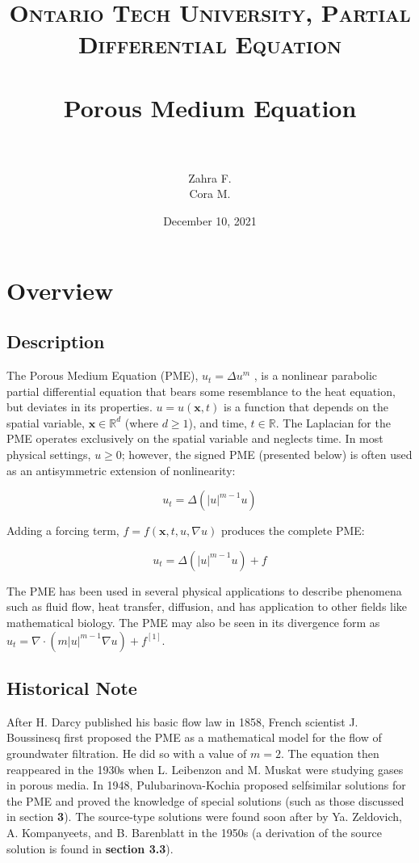 \documentclass[paper=a4, fontsize=12pt]{scrartcl} %
\title{	
\normalfont \normalsize 
\textsc{Ontario Tech University, Partial Differential Equation} \\ [25pt] %
\horrule{0.5pt} \\[0.4cm] %
\huge Porous Medium Equation\\ %
\horrule{2pt} \\[0.5cm] %
}
\author{Zahra F.\\ Cora M.}
\date{\normalsize December 10, 2021} %
\numberwithin{equation}{section} %
\numberwithin{table}{section} %
\begin{document}
\maketitle

\tableofcontents

\doublespacing
\section{Overview}
\subsection{Description}

The Porous Medium Equation (PME), $u_t = \Delta u^m$ , is a nonlinear parabolic partial differential equation that bears some resemblance to the heat equation, but deviates in its properties. $u=u(\mathbf{x}, t)$ is a function that depends on the spatial variable, $\mathbf{x} \in \mathbb{R}^d$ (where $d \geq 1$), and time, $t \in \mathbb{R}$.  The Laplacian for the PME operates exclusively on the spatial variable and neglects time. In most physical settings, $u \ge 0$; however, the signed PME (presented below) is often used as an antisymmetric extension of nonlinearity:

$$u_t = \Delta (|u|^{m-1}u)$$

Adding a forcing term, $f=f(\mathbf{x},t, u, \nabla u)$ produces the complete PME: 

$$ u_t  = \Delta (|u|^{m-1}u) + f$$

The PME has been used in several physical applications to describe phenomena such as fluid flow, heat transfer, diffusion, and has application to other fields like mathematical biology. The PME may also be seen in its divergence form as $u_t =  \nabla \cdot (m|u|^{m-1} \nabla u) + f ^{[1]}$.
\subsection{Historical Note}

After H. Darcy published his basic flow law in 1858, French scientist J. Boussinesq first proposed the PME as a mathematical model for the flow of groundwater filtration. He did so with a value of $m=2$. The equation then reappeared in the 1930s when L. Leibenzon and M. Muskat were studying gases in porous media. In 1948, Pulubarinova-Kochia proposed selfsimilar solutions for the PME and proved the knowledge of special solutions (such as those discussed in section \textbf{3}). The source-type solutions were found soon after by Ya. Zeldovich, A. Kompanyeets, and B. Barenblatt in the 1950s (a derivation of the source solution is found in \textbf{section 3.3}). 
\end{document}
